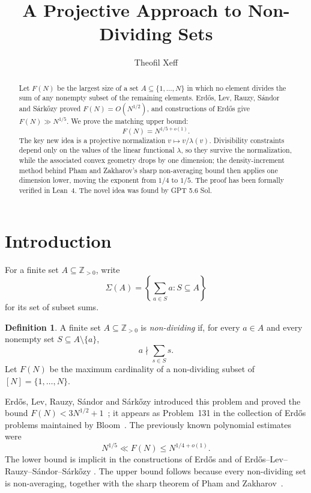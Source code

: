 \documentclass[11pt,reqno]{amsart}
\title[A projective approach to non-dividing sets]
{A Projective Approach to Non-Dividing Sets}
\author{Theofil Xeff}
\date{}
\theoremstyle{definition}
\newtheorem{definition}[theorem]{Definition}
\theoremstyle{remark}
\newcommand{\Z}{\mathbb Z}
\newcommand{\SigmaSet}{\Sigma}
\begin{document}
\begin{abstract}
Let $F(N)$ be the largest size of a set $A\subseteq\{1,\dots,N\}$ in which
no element divides the sum of any nonempty subset of the remaining
elements.  Erd\H{o}s, Lev, Rauzy, S\'andor and S\'ark\H{o}zy proved
$F(N)=O(N^{1/2})$, and constructions of Erd\H{o}s give
$F(N)\gg N^{1/5}$.  We prove the matching upper bound:
\[
 F(N)=N^{1/5+o(1)}.
\]
The key new idea is a projective normalization $v\mapsto v/\lambda(v)$.
Divisibility constraints depend only on the values of the linear
functional $\lambda$, so they survive the normalization, while the
associated convex geometry drops by one dimension; the density-increment
method behind Pham and Zakharov's sharp non-averaging bound then applies
one dimension lower, moving the exponent from $1/4$ to $1/5$.  The proof
has been formally verified in Lean~4. The novel idea was found by GPT 5.6 Sol.
\end{abstract}

\maketitle

\section{Introduction}
\label{sec:introduction}

For a finite set $A\subseteq\Z_{>0}$, write
\[
 \SigmaSet(A)=\left\{\sum_{a\in S}a:S\subseteq A\right\}
\]
for its set of subset sums.

\begin{definition}
A finite set $A\subseteq\Z_{>0}$ is \emph{non-dividing} if, for every
$a\in A$ and every nonempty set $S\subseteq A\setminus\{a\}$,
\[
 a\nmid \sum_{s\in S}s.
\]
Let $F(N)$ be the maximum cardinality of a non-dividing subset of
$[N]=\{1,\dots,N\}$.
\end{definition}

Erd\H{o}s, Lev, Rauzy, S\'andor and S\'ark\H{o}zy introduced this problem
and proved the bound $F(N)<3N^{1/2}+1$~\cite{ELRSS99}; it appears as
Problem~131 in the collection of Erd\H{o}s problems maintained by
Bloom~\cite{ErdosProblems}.  The previously
known polynomial estimates were
\[
 N^{1/5}\ll F(N)\le N^{1/4+o(1)}.
\]
The lower bound is implicit in the constructions of Erd\H{o}s and of
Erd\H{o}s--Lev--Rauzy--S\'andor--S\'ark\H{o}zy
\cite{Er97,ELRSS99}.  The upper bound follows because every non-dividing
set is non-averaging, together with the sharp theorem of Pham and
Zakharov~\cite{PhamZakharov}.
\end{document}

